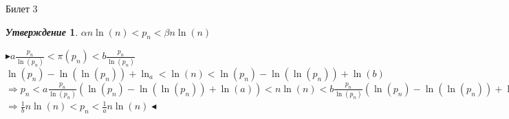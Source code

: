 \documentclass[a4paper,12pt]{article}
\newtheorem{utv}{\textit{Утверждение}}
\newcommand{\pb}{\blacktriangleright}
\newcommand{\pe}{\blacktriangleleft}
\newcommand{\Ra}{\Rightarrow}
\begin{document}
\newpage
\begin{mybox}{{Билет 3}}

\begin{formbox}{}
\begin{utv} $\alpha n \ln(n) < p_n < \beta n \ln(n)   $
\end{utv}
\end{formbox}
$\pb a \frac{p_n}{\ln(p_n)} < \pi(p_n) < b \frac{p_n}{\ln(p_n)} $\\
$\ln(p_n)  -\ln(\ln(p_n)) + \ln_a < \ln(n) < \ln (p_n) - \ln(\ln(p_n)) + \ln(b)  $\\
$\Ra p_n < a \frac{p_n}{\ln(p_n)} (\ln(p_n) - \ln(\ln(p_n)) + \ln(a))   < n \ln(n) <  b \frac{p_n}{\ln(p_n)} (\ln(p_n) - \ln(\ln(p_n)) + \ln(b))$\\$ \Ra \frac{1}{b} n \ln(n) < p_n < \frac{1}{a}n \ln(n)\pe $

\end{mybox}
\end{document}
